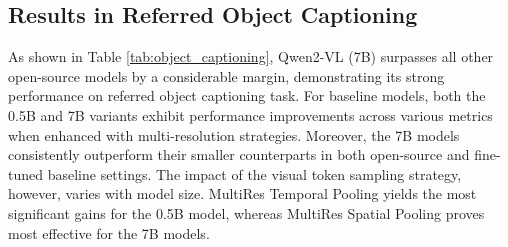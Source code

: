 \subsection{Results in Referred Object Captioning}
As shown in Table \ref{tab:object_captioning}, Qwen2-VL (7B) surpasses all other open-source models by a considerable margin, demonstrating its strong performance on referred object captioning task. For baseline models, both the 0.5B and 7B variants exhibit performance improvements across various metrics when enhanced with multi-resolution strategies. Moreover, the 7B models consistently outperform their smaller counterparts in both open-source and fine-tuned baseline settings. The impact of the visual token sampling strategy, however, varies with model size. MultiRes Temporal Pooling yields the most significant gains for the 0.5B model, whereas MultiRes Spatial Pooling proves most effective for the 7B models. 

